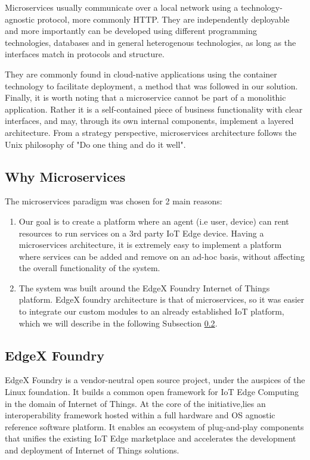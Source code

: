 Microservices usually communicate over a local network using a technology-agnostic protocol, more commonly HTTP. They are independently deployable and more importantly can be developed using different programming technologies, databases and in general heterogenous technologies, as long as the interfaces match in protocols and structure. 

They are commonly found in cloud-native applications using the container technology to facilitate deployment, a method that was followed in our solution. Finally, it is worth noting that a microservice cannot be part of a monolithic application. Rather it is a self-contained piece of business functionality with clear interfaces, and may, through its own internal components, implement a layered architecture. From a strategy perspective, microservices architecture follows the Unix philosophy of "Do one thing and do it well"\cite{krause2015microservices}.

\subsection{Why Microservices}

The microservices paradigm was chosen for 2 main reasons:
\begin{enumerate}
    \item Our goal is to create a platform where an agent (i.e user, device)  can rent resources to run services on a 3rd party IoT Edge device. Having a microservices architecture, it is extremely easy to implement a platform where services can be added and remove on an ad-hoc basis, without affecting the overall functionality of the system.
    \item The system was built around the EdgeX Foundry Internet of Things platform. EdgeX foundry architecture is that of microservices, so it was easier to integrate our custom modules to an already established IoT platform, which we will describe in the following Subsection \ref{sub:edgex}.
\end{enumerate}

\subsection{EdgeX Foundry} \label{sub:edgex}

EdgeX Foundry\cite{edgex-foundry} is a vendor-neutral open source project, under the auspices of the Linux foundation. It builds a common open framework for IoT Edge Computing in the domain of Internet of Things. At the core of the initiative,lies an interoperability framework hosted within a full hardware and OS agnostic reference software platform. It enables an ecosystem of plug-and-play components that unifies the existing IoT Edge marketplace and accelerates the development and deployment of Internet of Things solutions.

